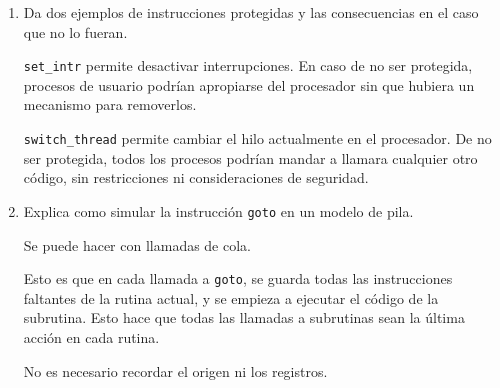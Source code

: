\documentclass{article}
\begin{document}
\begin{enumerate}
        \item Da dos ejemplos de instrucciones protegidas y las consecuencias en
        el caso que no lo fueran.

        \texttt{set\_intr} permite desactivar interrupciones. En caso de no ser
        protegida, procesos de usuario podrían apropiarse del procesador sin que
        hubiera un mecanismo para removerlos.

        \texttt{switch\_thread} permite cambiar el hilo actualmente en el 
        procesador. De no ser protegida, todos los procesos podrían mandar a 
        llamara cualquier otro código, sin restricciones ni consideraciones de
        seguridad.

        \item Explica como simular la instrucción \texttt{goto} en un modelo de 
        pila.

        Se puede hacer con llamadas de cola.

        Esto es que en cada llamada a \texttt{goto}, se guarda todas las
        instrucciones faltantes de la rutina actual, y se empieza a ejecutar el 
        código de la subrutina. Esto hace que todas las llamadas a subrutinas 
        sean la última acción en cada rutina.

        No es necesario recordar el origen ni los registros.

    \end{enumerate}
\end{document}

